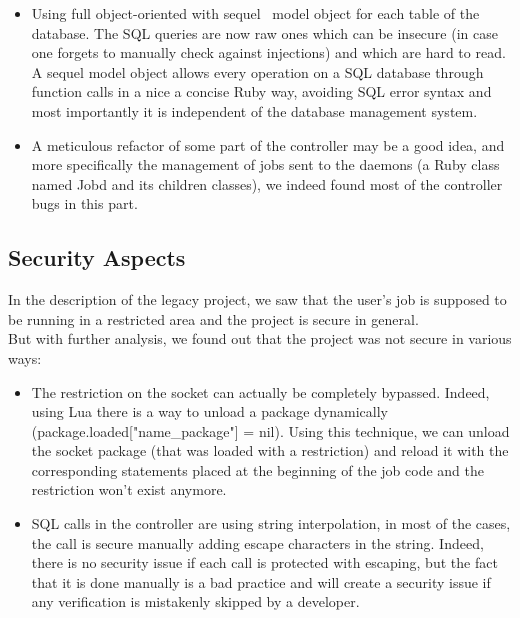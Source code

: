 \documentclass{eplmastersthesis}
\begin{document}
          \begin{itemize}
            \item Using full object-oriented with sequel~\cite{Sequel} model
            object for each table of the database. The SQL queries are now
            raw ones which can be insecure (in case one forgets to manually
            check against injections) and which are hard to read.\\
            A sequel model object allows every operation on a SQL database
            through function calls in a nice a concise Ruby way, avoiding
            SQL error syntax and most importantly it is independent of the
            database management system.
            \item A meticulous refactor of some part of the controller may be
            a good idea, and more specifically the management of jobs sent to
            the daemons (a Ruby class named Jobd and its children classes), we
            indeed found most of the controller bugs in this part.
          \end{itemize}

      \subsection{Security Aspects}

        In the description of the legacy project, we saw that the user's job is
        supposed to be running in a restricted area and the project is secure in
        general.\\
        But with further analysis, we found out that the project was not secure
        in various ways:\\
        \begin{itemize}
          \item The restriction on the socket can actually be completely
          bypassed. Indeed, using Lua there is a way to unload a package
          dynamically (package.loaded["name\_package"] = nil). Using this
          technique, we can unload the socket package (that was loaded with a
          restriction) and reload it with the corresponding statements placed
          at the beginning of the job code and the restriction won't exist
          anymore.
          \item SQL calls in the controller are using string interpolation,
          in most of the cases, the call is secure manually adding escape
          characters in the string. Indeed, there is no security issue if
          each call is protected with escaping, but the fact that it is done
          manually is a bad practice and will create a security issue if
          any verification is mistakenly skipped by a developer.
        \end{itemize}
\end{document}
